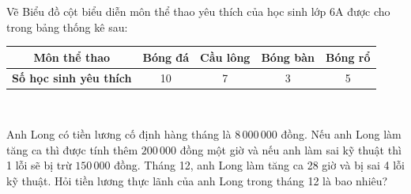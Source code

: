 \begin{bt} Vẽ Biểu đồ cột biểu diễn môn thể thao yêu thích của học sinh lớp 6A được cho trong bảng thống kê sau:
	\begin{center}
		\begin{tabular}{|c|c|c|c|c|}\hline
			\textbf{Môn thể thao}&\textbf{Bóng đá}&\textbf{Cầu lông}&\textbf{Bóng bàn}&\textbf{Bóng rổ} \\ \hline
			\textbf{Số học sinh yêu thích}&10&7&3&5 \\ \hline
		\end{tabular}\\
	\end{center}
\end{bt}


\begin{bt} Anh Long có tiền lương cố định hàng tháng là $8\,000\,000$ đồng. Nếu anh Long làm tăng ca thì được tính thêm $200\,000$ đồng một giờ và nếu anh làm sai kỹ thuật thì 1 lỗi sẽ bị trừ $150\,000$ đồng. Tháng 12, anh Long làm tăng ca 28 giờ và bị sai 4 lỗi kỹ thuật. Hỏi tiền lương thực lãnh của anh Long trong tháng 12 là bao nhiêu?
	
\end{bt}



